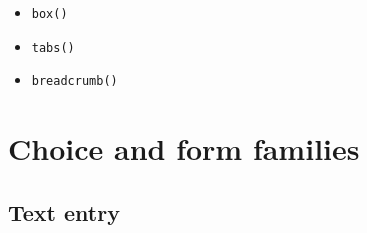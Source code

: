 \begin{itemize}
  \begin{itemize}
  \tightlist
  \item
    \texttt{b\allowbreak{}o\allowbreak{}x\allowbreak{}(\allowbreak{})}
  \item
    \texttt{t\allowbreak{}a\allowbreak{}b\allowbreak{}s\allowbreak{}(\allowbreak{})}
  \item
    \texttt{b\allowbreak{}r\allowbreak{}e\allowbreak{}a\allowbreak{}d\allowbreak{}c\allowbreak{}r\allowbreak{}u\allowbreak{}m\allowbreak{}b\allowbreak{}(\allowbreak{})}
  \end{itemize}
\end{itemize}

\section{Choice and form families}\label{record-019-choice-and-form-families}

\subsection{Text entry}\label{record-019-text-entry}

